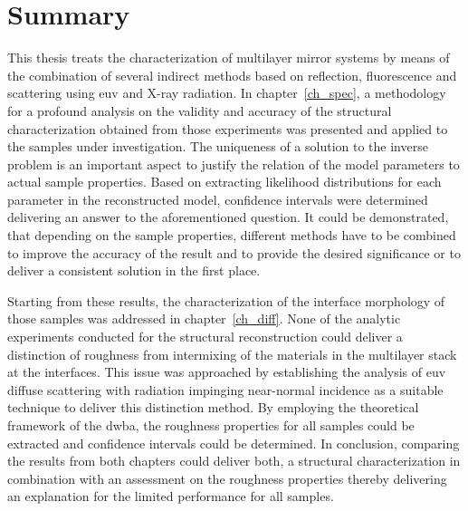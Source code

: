 \chapter{Summary} \label{ch_summary}
This thesis treats the characterization of multilayer mirror systems by means of the combination of several indirect methods based on reflection, fluorescence and scattering using \gls{euv} and X-ray radiation. In chapter~\ref{ch_spec}, a methodology for a profound analysis on the validity and accuracy of the structural characterization obtained from those experiments was presented and applied to the samples under investigation. The uniqueness of a solution to the inverse problem is an important aspect to justify the relation of the model parameters to actual sample properties. Based on extracting likelihood distributions for each parameter in the reconstructed model, confidence intervals were determined delivering an answer to the aforementioned question. It could be demonstrated, that depending on the sample properties, different methods have to be combined to improve the accuracy of the result and to provide the desired significance or to deliver a consistent solution in the first place.

Starting from these results, the characterization of the interface morphology of those samples was addressed in chapter~\ref{ch_diff}. None of the analytic experiments conducted for the structural reconstruction could deliver a distinction of roughness from intermixing of the materials in the multilayer stack at the interfaces. This issue was approached by establishing the analysis of \gls{euv} diffuse scattering with radiation impinging near-normal incidence as a suitable technique to deliver this distinction method. By employing the theoretical framework of the \glsdesc{dwba}, the roughness properties for all samples could be extracted and confidence intervals could be determined. In conclusion, comparing the results from both chapters could deliver both, a structural characterization in combination with an assessment on the roughness properties thereby delivering an explanation for the limited performance for all samples.

